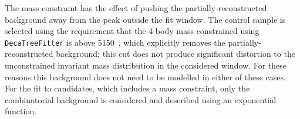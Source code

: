 The \jpsi mass constraint has the effect of pushing the partially-reconstructed   background away from 
the peak outside the fit window. The \jpsi control sample is selected using the requirement that the 4-body 
mass constrained using \verb!DecaTreeFitter! is above 5150~\mevc, which explicitly removes
the partially-reconstructed   background; this cut does not produce significant distortion to the
unconstrained invariant mass distribution in the considered window. 
For these reasons this background does not need to be modelled in either of these cases.
%
%
%
%
%
%
%
%
%
%
For the fit to \BdToKstPsiee candidates, which includes a \psitwos mass constraint, only the combinatorial background is considered
and described using an exponential function.
%

